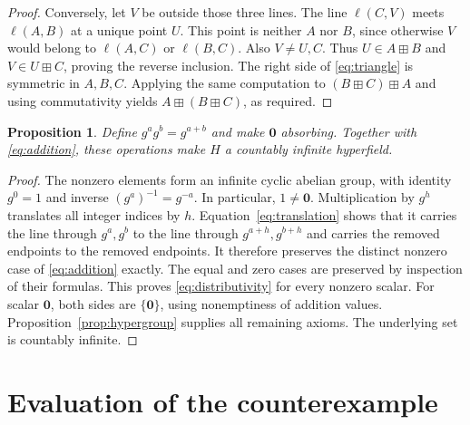 \documentclass[11pt]{article}
\newtheorem{proposition}[theorem]{Proposition}
\theoremstyle{remark}
\newcommand{\hz}{\mathbf 0}
\newcommand{\hs}{\boxplus}
\begin{document}
\begin{proof}
Conversely, let $V$ be outside those three lines. The line $\ell(C,V)$
meets $\ell(A,B)$ at a unique point $U$. This point is neither $A$
nor $B$, since otherwise $V$ would belong to $\ell(A,C)$ or
$\ell(B,C)$. Also $V\ne U,C$. Thus
$U\in A\hs B$ and $V\in U\hs C$, proving the reverse inclusion.
The right side of \eqref{eq:triangle} is symmetric in $A,B,C$.
Applying the same computation to $(B\hs C)\hs A$ and using
commutativity yields $A\hs(B\hs C)$, as required.
\end{proof}

\begin{proposition}\label{prop:hyperfield}
Define $g^ag^b=g^{a+b}$ and make $\hz$ absorbing. Together with
\eqref{eq:addition}, these operations make $H$ a countably infinite
hyperfield.
\end{proposition}

\begin{proof}
The nonzero elements form an infinite cyclic abelian group, with
identity $g^0=1$ and inverse $(g^a)^{-1}=g^{-a}$. In particular,
$1\ne\hz$. Multiplication by $g^h$ translates all integer indices by
$h$. Equation~\eqref{eq:translation} shows that it carries the line
through $g^a,g^b$ to the line through $g^{a+h},g^{b+h}$ and carries
the removed endpoints to the removed endpoints. It therefore preserves
the distinct nonzero case of \eqref{eq:addition} exactly. The equal
and zero cases are preserved by inspection of their formulas. This
proves \eqref{eq:distributivity} for every nonzero scalar. For scalar
$\hz$, both sides are $\{\hz\}$, using nonemptiness of addition values.
Proposition~\ref{prop:hypergroup} supplies all remaining axioms.
The underlying set is countably infinite.
\end{proof}

\section{Evaluation of the counterexample}\label{sec:witness}
\end{document}
